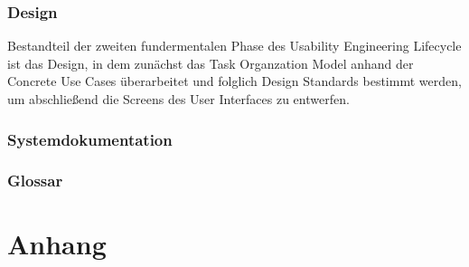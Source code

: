 \documentclass[a4paper,11pt]{article}%
\renewcommand{\\}{\vspace*{0.5\baselineskip} \newline}
\begin{document}
	\tableofcontents
	\newpage
	
	\listoftables{}
	\newpage
	
	\listoffigures{}
	\newpage
	
	
	\newpage
	
	
	\newpage
	
	
	\newpage
	
	
	\newpage
	
	
	\newpage
	
	
	\newpage
	
	
	\newpage
	
	\section{Design}
	Bestandteil der zweiten fundermentalen Phase des Usability Engineering Lifecycle ist das Design, in dem zunächst das Task Organzation Model anhand der Concrete Use Cases überarbeitet und folglich Design Standards bestimmt werden, um abschließend die Screens des User Interfaces zu entwerfen. 
	
	\newpage
	
	\section{Systemdokumentation}
	
	\newpage
	
	
	\newpage
	
	
	\newpage
	
	\appendix
	\section*{Glossar}
	\newpage
	
	\appendix
	\vspace*{\fill}
	\part*{Anhang}
	\setcounter{section}{0}%
	\setcounter{subsection}{0}%
	\setcounter{figure}{0}
	\renewcommand{\thesection}{\Alph{section}}
	\renewcommand\thefigure{\Alph{section}\arabic{figure}}
	\vfill
	\newpage
	
	\newpage
	
\end{document}
